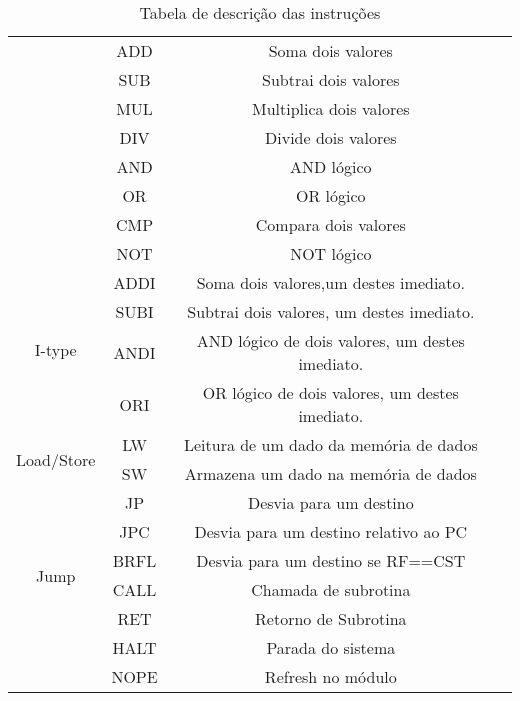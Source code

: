 \begin{table}[H]
\begin{center}
\begin{longtable}[pos]{| c | c | c | m{7cm} |}
          \hline
          \endlastfoot    
			\multirow{8}{*}{R-type} & ADD & Soma dois valores \\ \cline{2-3}	
	& SUB & Subtrai dois valores \\ \cline{2-3}	
	& MUL & Multiplica dois valores \\ \cline{2-3}	
	& DIV & Divide dois valores \\ \cline{2-3}
	& AND & AND lógico \\ \cline{2-3}
	& OR & OR lógico  \\ \cline{2-3}
	& CMP & Compara dois valores \\ \cline{2-3}
	& NOT & NOT lógico \\ \hline 
	\multirow{4}{*}{I-type} & ADDI & Soma dois valores,um destes imediato. \\ \cline{2-3}
	& SUBI & Subtrai dois valores, um destes imediato. \\ \cline{2-3}
	& ANDI & AND lógico de dois valores, um destes imediato. \\ \cline{2-3}
	& ORI & OR lógico de dois valores, um destes imediato. \\ \hline
	\multirow{2}{*}{Load/Store} & LW & Leitura de um dado da memória de dados \\ \cline{2-3}
	& SW & Armazena um dado na memória de dados \\ \hline
	\multirow{6}{*}{Jump} & JP & Desvia para um destino \\ \cline{2-3}
	& JPC & Desvia para um destino relativo ao PC \\ \cline{2-3}
	& BRFL & Desvia para um destino se RF==CST \\ \cline{2-3}
	& CALL & Chamada de subrotina \\ \cline{2-3}
	& RET & Retorno de Subrotina \\ \cline{2-3}
	& HALT & Parada do sistema \\ \cline{2-3}
	& NOPE & Refresh no módulo \\ \hline
\end{longtable}
\caption{Tabela de descrição das instruções}
\end{center}
\end{table}

